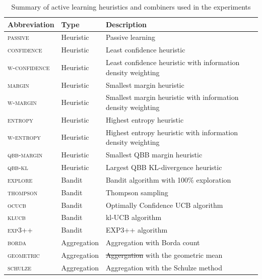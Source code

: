 \documentclass[fleqn,10pt,lineno]{wlpeerj} %
\providecommand{\DIFaddtex}[1]{{\protect\color{blue}\uwave{#1}}} %
\providecommand{\DIFdeltex}[1]{{\protect\color{red}\sout{#1}}}                      %
\providecommand{\DIFaddFL}[1]{\DIFadd{#1}} %
\providecommand{\DIFdelFL}[1]{\DIFdel{#1}} %
\providecommand{\DIFaddbeginFL}{} %
\providecommand{\DIFaddendFL}{} %
\providecommand{\DIFdelbeginFL}{} %
\providecommand{\DIFdelendFL}{} %
\providecommand{\DIFadd}[1]{\texorpdfstring{\DIFaddtex{#1}}{#1}} %
\providecommand{\DIFdel}[1]{\texorpdfstring{\DIFdeltex{#1}}{}} %
\begin{document}
\begin{table}[htbp]
	\caption {Summary of active learning heuristics and combiners used
	in the experiments\DIFaddbeginFL \DIFaddFL{.}\DIFaddendFL } \label{tab:abbre}
	\centering
	\begin{tabular}{lll}
		\toprule
		Abbreviation & Type  & Description \\
		\midrule
        \textsc{passive}
        	& Heuristic & Passive learning \\
		\textsc{confidence}
			& Heuristic & Least confidence heuristic \\
		\textsc{w-confidence}
        	& Heuristic & Least confidence heuristic with information density weighting \\
        \textsc{margin}
        	& Heuristic & Smallest margin heuristic \\
        \textsc{w-margin}
        	& Heuristic & Smallest margin heuristic with information density weighting \\
        \textsc{entropy}
        	& Heuristic & Highest entropy heuristic \\
		\textsc{w-entropy}
        	& Heuristic & Highest entropy heuristic with information density weighting \\
        \textsc{qbb-margin}
        	& Heuristic & Smallest QBB margin heuristic \\
		\textsc{qbb-kl}
        	& Heuristic & Largest QBB KL-divergence heuristic \\
        \textsc{explore}
			& Bandit & Bandit algorithm with 100\% exploration \\
		\textsc{thompson}
        	& Bandit & Thompson sampling \\
		\textsc{ocucb}
			& Bandit & Optimally Confidence UCB algorithm \\
		\textsc{klucb}
			& Bandit & kl-UCB algorithm \\
		\textsc{exp3++}
			& Bandit & EXP3++ algorithm \\
		\textsc{borda}
			& Aggregation & Aggregation with Borda count \\
		\textsc{geometric}
			& Aggregation & \DIFdelbeginFL \DIFdelFL{Aggergation }\DIFdelendFL \DIFaddbeginFL \DIFaddFL{Aggregation }\DIFaddendFL with the geometric mean \\
		\textsc{schulze}
			& Aggregation & Aggregation with the Schulze method \\
		\bottomrule
	\end{tabular}
\end{table}
\end{document}
